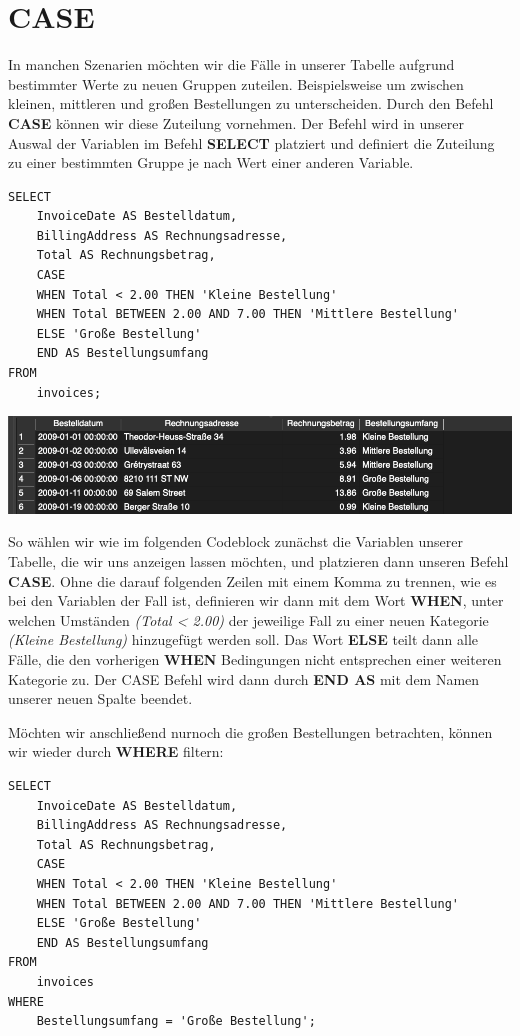 \documentclass[
]{book}
\begin{document}
\hypertarget{case}{%
\section{CASE}\label{case}}

In manchen Szenarien möchten wir die Fälle in unserer Tabelle aufgrund bestimmter Werte zu neuen Gruppen zuteilen. Beispielsweise um zwischen kleinen, mittleren und großen Bestellungen zu unterscheiden. Durch den Befehl \textbf{CASE} können wir diese Zuteilung vornehmen. Der Befehl wird in unserer Auswal der Variablen im Befehl \textbf{SELECT} platziert und definiert die Zuteilung zu einer bestimmten Gruppe je nach Wert einer anderen Variable.

\begin{verbatim}
SELECT
    InvoiceDate AS Bestelldatum,
    BillingAddress AS Rechnungsadresse,
    Total AS Rechnungsbetrag,
    CASE
    WHEN Total < 2.00 THEN 'Kleine Bestellung'
    WHEN Total BETWEEN 2.00 AND 7.00 THEN 'Mittlere Bestellung'
    ELSE 'Große Bestellung'
    END AS Bestellungsumfang
FROM
    invoices;
\end{verbatim}

\includegraphics[width=10.41667in,height=\textheight]{img-FUNC8.png}

So wählen wir wie im folgenden Codeblock zunächst die Variablen unserer Tabelle, die wir uns anzeigen lassen möchten, und platzieren dann unseren Befehl \textbf{CASE}. Ohne die darauf folgenden Zeilen mit einem Komma zu trennen, wie es bei den Variablen der Fall ist, definieren wir dann mit dem Wort \textbf{WHEN}, unter welchen Umständen \emph{(Total \textless{} 2.00)} der jeweilige Fall zu einer neuen Kategorie \emph{(Kleine Bestellung)} hinzugefügt werden soll. Das Wort \textbf{ELSE} teilt dann alle Fälle, die den vorherigen \textbf{WHEN} Bedingungen nicht entsprechen einer weiteren Kategorie zu. Der CASE Befehl wird dann durch \textbf{END AS} mit dem Namen unserer neuen Spalte beendet.

Möchten wir anschließend nurnoch die großen Bestellungen betrachten, können wir wieder durch \textbf{WHERE} filtern:

\begin{verbatim}
SELECT
    InvoiceDate AS Bestelldatum,
    BillingAddress AS Rechnungsadresse,
    Total AS Rechnungsbetrag,
    CASE
    WHEN Total < 2.00 THEN 'Kleine Bestellung'
    WHEN Total BETWEEN 2.00 AND 7.00 THEN 'Mittlere Bestellung'
    ELSE 'Große Bestellung'
    END AS Bestellungsumfang
FROM
    invoices
WHERE
    Bestellungsumfang = 'Große Bestellung';
\end{verbatim}
\end{document}
